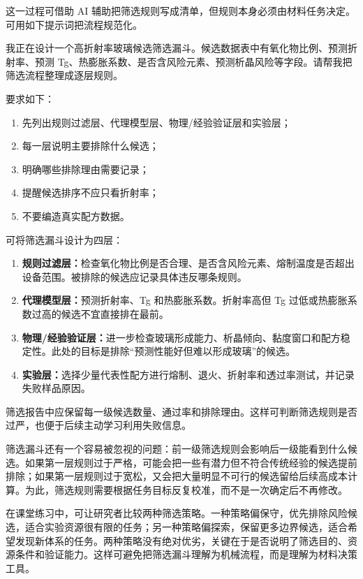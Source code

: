 这一过程可借助 AI 辅助把筛选规则写成清单，但规则本身必须由材料任务决定。可用如下提示词把流程规范化。

\begin{samepage}
\begin{userbox}
我正在设计一个高折射率玻璃候选筛选漏斗。候选数据表中有氧化物比例、预测折射率、预测 Tg、热膨胀系数、是否含风险元素、预测析晶风险等字段。请帮我把筛选流程整理成逐层规则。

要求如下：
\begin{enumerate}
\item 先列出规则过滤层、代理模型层、物理/经验验证层和实验层；
\item 每一层说明主要排除什么候选；
\item 明确哪些排除理由需要记录；
\item 提醒候选排序不应只看折射率；
\item 不要编造真实配方数据。
\end{enumerate}
\end{userbox}

\begin{aibox}
可将筛选漏斗设计为四层：

\begin{enumerate}
\item \textbf{规则过滤层：}检查氧化物比例是否合理、是否含风险元素、熔制温度是否超出设备范围。被排除的候选应记录具体违反哪条规则。
\item \textbf{代理模型层：}预测折射率、Tg 和热膨胀系数。折射率高但 Tg 过低或热膨胀系数过高的候选不宜直接排在最前。
\item \textbf{物理/经验验证层：}进一步检查玻璃形成能力、析晶倾向、黏度窗口和配方稳定性。此处的目标是排除“预测性能好但难以形成玻璃”的候选。
\item \textbf{实验层：}选择少量代表性配方进行熔制、退火、折射率和透过率测试，并记录失败样品原因。
\end{enumerate}

筛选报告中应保留每一级候选数量、通过率和排除理由。这样可判断筛选规则是否过严，也便于后续主动学习利用失败信息。
\end{aibox}
\end{samepage}

筛选漏斗还有一个容易被忽视的问题：前一级筛选规则会影响后一级能看到什么候选。如果第一层规则过于严格，可能会把一些有潜力但不符合传统经验的候选提前排除；如果第一层规则过于宽松，又会把大量明显不可行的候选留给后续高成本计算。为此，筛选规则需要根据任务目标反复校准，而不是一次确定后不再修改。

在课堂练习中，可让研究者比较两种筛选策略。一种策略偏保守，优先排除风险候选，适合实验资源很有限的任务；另一种策略偏探索，保留更多边界候选，适合希望发现新体系的任务。两种策略没有绝对优劣，关键在于是否说明了筛选目的、资源条件和验证能力。这样可避免把筛选漏斗理解为机械流程，而是理解为材料决策工具。


